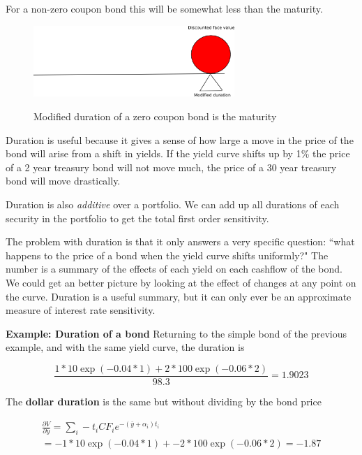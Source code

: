  For a non-zero coupon bond this will be somewhat less than the maturity. 
 
\begin{figure}[htbp]
\begin{center}
  \includegraphics[width=3in]{pics/modDurnZc.png} \\
  \caption{Modified duration of a zero coupon bond is the maturity }
\label{modDurnZc}
\end{center}
\end{figure}
 
Duration is useful because it gives a sense of how large a move in the price of the bond will arise from a shift in yields. If the yield curve shifts up by 1\% the price of a 2 year treasury bond will not move much, the price of a 30 year treasury bond will move drastically. 

Duration is also \textit{additive} over a portfolio. We can add up all durations of each security in the portfolio to get the total first order sensitivity. 

The problem with duration is that it only answers a very specific question: ``what happens to the price of a bond when the yield curve shifts uniformly?" The number is a summary of the effects of each yield on each cashflow of the bond. We could get an better picture by looking at the effect of changes at any point on the curve. Duration is a useful summary, but it can only ever be an approximate measure of interest rate sensitivity.  


\textbf{Example: Duration of a bond}
Returning to the simple bond of the previous example, and with the same yield curve, the duration is

\[ \frac{1*10 \exp(-0.04*1) + 2*100\exp(-0.06*2)}{98.3} = 1.9023  \] 

The \textbf{dollar duration} is the same but without dividing by the bond price

\begin{eqnarray*}
\frac{\partial V}{\partial \bar{y}} = \sum_i -t_i CF_i e^{-(\bar{y}+\alpha_i)t_i}\\
  = -1*10 \exp(-0.04*1) + -2*100\exp(-0.06*2) = -1.87 
 \end{eqnarray*}

